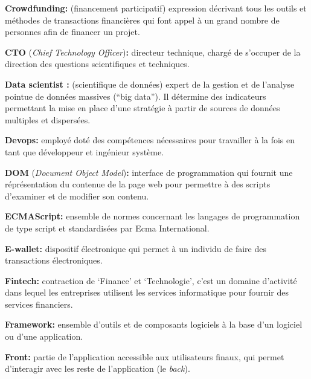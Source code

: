 \documentclass[12pt,a4paper]{article}
\begin{document}
  \bigskip

  \textbf{Crowdfunding:} (financement participatif) expression décrivant
  tous les outils et méthodes de transactions financières qui font appel à
  un grand nombre de personnes afin de financer un projet.

  \bigskip

  \textbf{CTO} (\emph{Chief Technology Officer})\textbf{:} directeur
  technique, chargé de s'occuper de la direction des questions
  scientifiques et techniques.

  \bigskip

  \textbf{Data scientist :} (scientifique de données) expert de la gestion
  et de l'analyse pointue de données massives (``big data''). Il détermine
  des indicateurs permettant la mise en place d'une stratégie à partir de
  sources de données multiples et dispersées.

  \bigskip

  \textbf{Devops:} employé doté des compétences nécessaires pour
  travailler à la fois en tant que développeur et ingénieur système.

  \bigskip

  \textbf{DOM} (\emph{Document Object Model})\textbf{:} interface de
  programmation qui fournit une réprésentation du contenue de la page web
  pour permettre à des scripts d'examiner et de modifier son contenu.

  \bigskip

  \textbf{ECMAScript:} ensemble de normes concernant les langages de
  programmation de type script et standardisées par Ecma International.

  \bigskip

  \textbf{E-wallet:} dispositif électronique qui permet à un individu de
  faire des transactions électroniques.

  \bigskip

  \textbf{Fintech:} contraction de `Finance' et `Technologie', c'est un
  domaine d'activité dans lequel les entreprises utilisent les services
  informatique pour fournir des services financiers.

  \bigskip

  \textbf{Framework:} ensemble d'outils et de composants logiciels à la
  base d'un logiciel ou d'une application.

  \bigskip

  \textbf{Front:} partie de l'application accessible aux utilisateurs
  finaux, qui permet d'interagir avec les reste de l'application (le
  \emph{back}).
\end{document}
